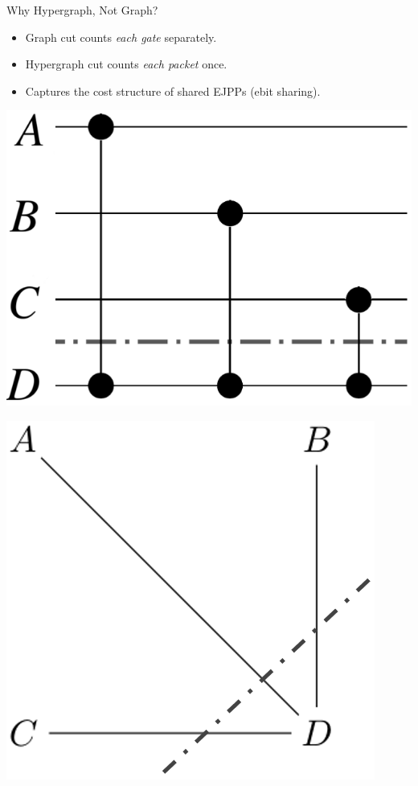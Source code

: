 \documentclass{beamer}
\begin{document}
	\begin{frame}{Why Hypergraph, Not Graph?}
		\begin{itemize}
			\item Graph cut counts \textit{each gate} separately.
			\item Hypergraph cut counts \textit{each packet} once.
			\item Captures the cost structure of shared EJPPs (ebit sharing).
		\end{itemize}
		\begin{minipage}{.3\linewidth}
			\includegraphics[width=.9\textwidth]{figures/why1.png}
		\end{minipage}
		\begin{minipage}{.3\linewidth}
			\includegraphics[width=.9\textwidth]{figures/why2.png}

\end{minipage}
\end{frame}
\end{document}
